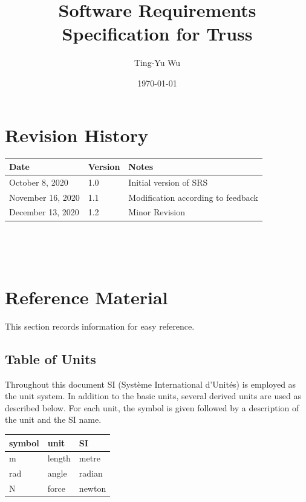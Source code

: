 \documentclass[12pt]{article}
\begin{document}
\title{Software Requirements Specification for Truss} 
\author{Ting-Yu Wu}
\date{\today}
	
\maketitle

\section*{Revision History}

\begin{tabularx}{\textwidth}{p{3.5cm}p{2cm}X}
	\toprule {\bf Date} & {\bf Version} & {\bf Notes}\\
	\midrule
	October 8, 2020 & 1.0 & Initial version of SRS\\
	November 16, 2020 & 1.1 & Modification according to feedback\\
	December 13, 2020 & 1.2 & Minor Revision\\
	\bottomrule
\end{tabularx}

~\newpage


\tableofcontents

~\newpage

\section{Reference Material}

This section records information for easy reference.

\subsection{Table of Units}

Throughout this document SI (Syst\`{e}me International d'Unit\'{e}s) is employed
as the unit system.  In addition to the basic units, several derived units are
used as described below.  For each unit, the symbol is given followed by a
description of the unit and the SI name.
~\newline

\renewcommand{\arraystretch}{1.2}
  \noindent \begin{tabular}{l l l} 
    \toprule		
    \textbf{symbol} & \textbf{unit} & \textbf{SI}\\
    \midrule 
    \si{\metre} & length & metre\\
    \si{\radian} & angle & radian\\
    \si{\newton} & force & newton\\
    \bottomrule
  \end{tabular}
\end{document}
